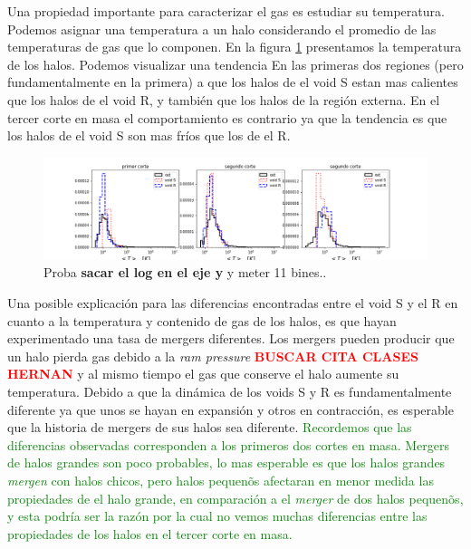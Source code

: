 Una propiedad importante para caracterizar el gas es estudiar su temperatura. Podemos asignar una temperatura a un halo considerando el promedio de las temperaturas de gas que lo componen. En la figura \ref{Temperaturas} presentamos la temperatura de los halos. Podemos visualizar una tendencia En las primeras dos regiones (pero fundamentalmente en la primera) a que los halos de el void S estan mas calientes que los halos de el void R, y tambi\'en que los halos de la regi\'on externa. En el tercer corte en masa el comportamiento es contrario ya que la tendencia es que los halos de el void S son mas fr\'ios que los de el R. 


\begin{figure}[h]
\centering
\includegraphics[width=\textwidth]{Figures/temperatura_cortemasa_mean.png}
\decoRule
\caption[asd]{Proba \textbf{sacar el log en el eje y} y meter 11 bines..}
\label{Temperaturas}
\end{figure}

Una posible explicaci\'on para las diferencias encontradas entre el void S y el R en cuanto a la temperatura y contenido de gas de los halos, es que hayan experimentado una tasa de mergers diferentes. Los mergers pueden producir que un halo pierda gas debido a la \textit{ram pressure} \textcolor{red}{\textbf{BUSCAR CITA CLASES HERNAN}} y al mismo tiempo el gas que conserve el halo aumente su temperatura. Debido a que la din\'amica de los voids S y R es fundamentalmente diferente ya que unos se hayan en expansi\'on y otros en contracci\'on, es esperable que la historia de mergers de sus halos sea diferente. \textcolor{green}{Recordemos que las diferencias observadas corresponden a los primeros dos cortes en masa. Mergers de halos grandes son poco probables, lo mas esperable es que los halos grandes \textit{mergen} con halos chicos, pero halos pequen\~os afectaran en menor medida las propiedades de el halo grande, en comparaci\'on a el \textit{merger} de dos halos pequen\~os, y esta podr\'ia ser la raz\'on por la cual no vemos muchas diferencias entre las propiedades de los halos en el tercer corte en masa.}


